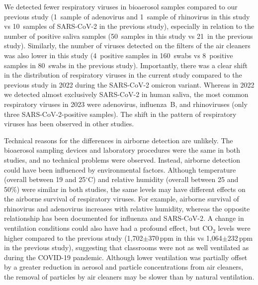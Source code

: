 \documentclass[fleqn,11pt]{wlscirep}
\begin{document}
We detected fewer respiratory viruses in bioaerosol samples compared to our previous study\cite{Banholzer2023PLoSMed} (1~sample of adenovirus and 1~sample of rhinovirus in this study vs 10~samples of SARS-CoV-2 in the previous study), especially in relation to the number of positive saliva samples (50~samples in this study vs 21~in the previous study). Similarly, the number of viruses detected on the filters of the air cleaners was also lower in this study (4~positive samples in 160~swabs vs 8~positive samples in 80~swabs in the previous study). Importantly, there was a clear shift in the distribution of respiratory viruses in the current study compared to the previous study in 2022 during the SARS-CoV-2 omicron variant. Whereas in 2022 we detected almost exclusively SARS-CoV-2 in human saliva, the most common respiratory viruses in 2023 were adenovirus, influenza~B, and rhinoviruses (only three SARS-CoV-2-positive samples). The shift in the pattern of respiratory viruses has been observed in other studies\cite{Nygaard2023Lancet,Sauteur2022EuroSurv}. 


Technical reasons for the differences in airborne detection are unlikely. The bioaerosol sampling devices and laboratory procedures were the same in both studies, and no technical problems were observed. Instead, airborne detection could have been influenced by environmental factors. Although temperature (overall between 19 and 25$^{\circ}$C) and relative humidity (overall between 25 and 50\%) were similar in both studies, the same levels may have different effects on the airborne survival of respiratory viruses. For example, airborne survival of rhinovirus and adenovirus increases with relative humidity, whereas the opposite relationship has been documented for influenza and SARS-CoV-2\cite{Tellier2009JTRSI,Ahlawat2020AAQR,Biryukov2020mS,Karim1985CJM,Davis1971AM}. A change in ventilation conditions could also have had a profound effect, but CO$_2$ levels were higher compared to the previous study (1,702$\pm$370\,ppm in this vs 1,064$\pm$232\,ppm in the previous study), suggesting that classrooms were not as well ventilated as during the COVID-19 pandemic. Although lower ventilation was partially offset by a greater reduction in aerosol and particle concentrations from air cleaners, the removal of particles by air cleaners may be slower than by natural ventilation.

\end{document}
